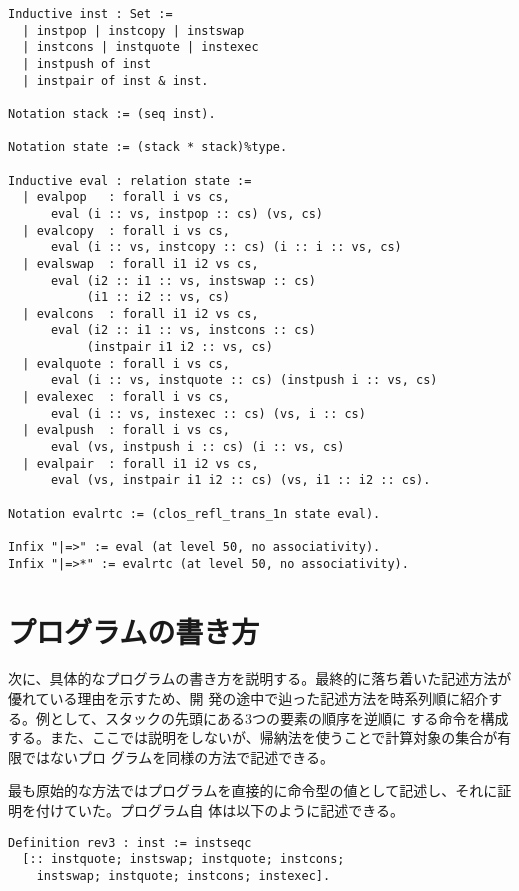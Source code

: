 \documentclass[a4paper, 10pt, twocolumn, titlepage]{ujarticle}
\renewcommand{\{}{\symbol{"7B}}
\renewcommand{\}}{\symbol{"7D}}
\begin{document}
\begin{lstlisting}[style=plain]
Inductive inst : Set :=
  | instpop | instcopy | instswap
  | instcons | instquote | instexec
  | instpush of inst
  | instpair of inst & inst.

Notation stack := (seq inst).

Notation state := (stack * stack)%type.

Inductive eval : relation state :=
  | evalpop   : forall i vs cs,
      eval (i :: vs, instpop :: cs) (vs, cs)
  | evalcopy  : forall i vs cs,
      eval (i :: vs, instcopy :: cs) (i :: i :: vs, cs)
  | evalswap  : forall i1 i2 vs cs,
      eval (i2 :: i1 :: vs, instswap :: cs)
           (i1 :: i2 :: vs, cs)
  | evalcons  : forall i1 i2 vs cs,
      eval (i2 :: i1 :: vs, instcons :: cs)
           (instpair i1 i2 :: vs, cs)
  | evalquote : forall i vs cs,
      eval (i :: vs, instquote :: cs) (instpush i :: vs, cs)
  | evalexec  : forall i vs cs,
      eval (i :: vs, instexec :: cs) (vs, i :: cs)
  | evalpush  : forall i vs cs,
      eval (vs, instpush i :: cs) (i :: vs, cs)
  | evalpair  : forall i1 i2 vs cs,
      eval (vs, instpair i1 i2 :: cs) (vs, i1 :: i2 :: cs).

Notation evalrtc := (clos_refl_trans_1n state eval).

Infix "|=>" := eval (at level 50, no associativity).
Infix "|=>*" := evalrtc (at level 50, no associativity).
\end{lstlisting}

\section{プログラムの書き方}

次に、具体的なプログラムの書き方を説明する。最終的に落ち着いた記述方法が優れている理由を示すため、開
発の途中で辿った記述方法を時系列順に紹介する。例として、スタックの先頭にある3つの要素の順序を逆順に
する命令を構成する。また、ここでは説明をしないが、帰納法を使うことで計算対象の集合が有限ではないプロ
グラムを同様の方法で記述できる。

最も原始的な方法ではプログラムを直接的に命令型の値として記述し、それに証明を付けていた。プログラム自
体は以下のように記述できる。

\begin{lstlisting}[style=plain]
Definition rev3 : inst := instseqc
  [:: instquote; instswap; instquote; instcons;
    instswap; instquote; instcons; instexec].
\end{lstlisting}
\end{document}
